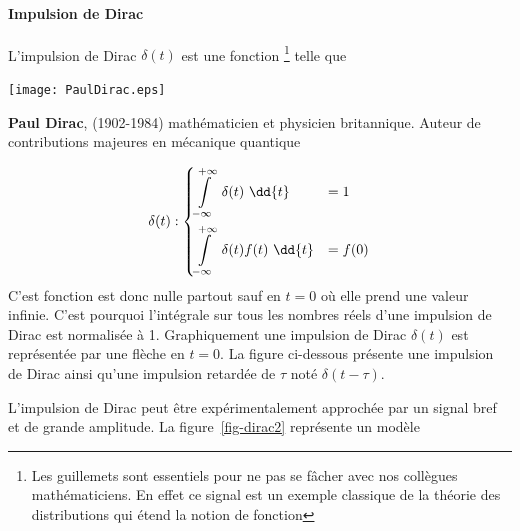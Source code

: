 \paragraph{Impulsion de Dirac}
L'impulsion de Dirac
$\delta(t)$ est une \og fonction\fg 
\footnote{Les guillemets sont essentiels pour ne pas se fâcher avec 
nos collègues mathématiciens. En effet ce signal est un exemple classique de la 
théorie des distributions qui étend la notion de fonction} telle que
\begin{marginfigure}[0.5em]
    \centering
    \texttt{[image: PaulDirac.eps]} 
    \captionsetup{width=0.8\linewidth}
    \caption*{\textbf{Paul Dirac}, (1902-1984) 
              mathématicien et physicien britannique. Auteur de 
              contributions majeures en mécanique quantique} 
\end{marginfigure}
\begin{align*}
    \delta(t) : 
    \begin{dcases}
    	\int\limits_{-\infty}^{+\infty}	 \delta(t)\,\,\dd{t}&=1   \\
        \int\limits_{-\infty}^{+\infty}  \delta(t)f(t)\,\,\dd{t}&=f(0)	
    \end{dcases}
\end{align*}
C'est fonction est donc nulle partout sauf en $t=0$ où elle prend 
une valeur infinie. C'est pourquoi l'intégrale sur tous les nombres réels 
d'une impulsion de Dirac est normalisée à 1.
Graphiquement une impulsion de Dirac $\delta(t)$ est 
représentée par une flèche en $t=0$. La figure ci-dessous présente 
une impulsion de Dirac ainsi qu'une 
impulsion retardée de $\tau$ noté $\delta(t-\tau)$.
\begin{figure}[!h]
    \centering
    
\end{figure}
L'impulsion de Dirac peut être expérimentalement approchée par un signal 
bref et de grande amplitude. La figure~\ref{fig-dirac2} représente un modèle 
